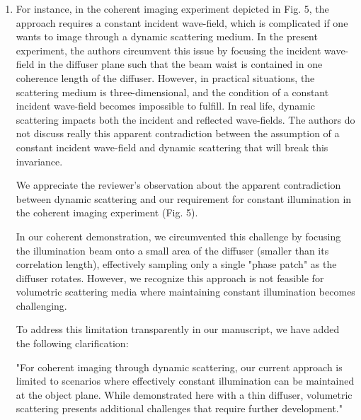 \documentclass[12pt]{article}
\newenvironment{solved_reviewercomment}
    {\begin{tcolorbox}[width=\linewidth,colback=gray!5,colframe=solved_commentcolor!50,title=Reviewer Comment,left=5pt,right=5pt]}
    {\end{tcolorbox}}
\newenvironment{ourresponse}
    {\begin{tcolorbox}[width=\linewidth,breakable,enhanced,colback=gray!5,colframe=responsecolor!50,title=Response,left=5pt,right=5pt]}
    {\end{tcolorbox}}
\begin{document}
\begin{enumerate}[label=\arabic*.]
    \item \leavevmode\vspace{-\baselineskip}
    \begin{solved_reviewercomment}
        
        For instance, in the coherent imaging experiment depicted in Fig. 5, the approach requires a constant incident wave-field, which is complicated if one wants to image through a dynamic scattering medium. In the present experiment, the authors circumvent this issue by focusing the incident wave-field in the diffuser plane such that the beam waist is contained in one coherence length of the diffuser. However, in practical situations, the scattering medium is three-dimensional, and the condition of a constant incident wave-field becomes impossible to fulfill. In real life, dynamic scattering impacts both the incident and reflected wave-fields. The authors do not discuss really this apparent contradiction between the assumption of a constant incident wave-field and dynamic scattering that will break this invariance.

    \end{solved_reviewercomment}
    \begin{ourresponse}
    We appreciate the reviewer's observation about the apparent contradiction between dynamic scattering and our requirement for constant illumination in the coherent imaging experiment (Fig. 5). 
    
    In our coherent demonstration, we circumvented this challenge by focusing the illumination beam onto a small area of the diffuser (smaller than its correlation length), effectively sampling only a single "phase patch" as the diffuser rotates. However, we recognize this approach is not feasible for volumetric scattering media where maintaining constant illumination becomes challenging.
    
    To address this limitation transparently in our manuscript, we have added the following clarification:
    
    "For coherent imaging through dynamic scattering, our current approach is limited to scenarios where effectively constant illumination can be maintained at the object plane. While demonstrated here with a thin diffuser, volumetric scattering presents additional challenges that require further development."
    

\end{ourresponse}
\end{enumerate}
\end{document}
